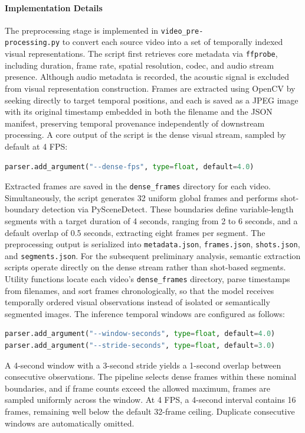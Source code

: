 \paragraph{Implementation Details} The preprocessing stage is implemented in \texttt{video\_pre-\\processing.py} to convert each source video into a set of temporally indexed visual representations. The script first retrieves core metadata via \texttt{ffprobe}, including duration, frame rate, spatial resolution, codec, and audio stream presence. Although audio metadata is recorded, the acoustic signal is excluded from visual representation construction. Frames are extracted using OpenCV by seeking directly to target temporal positions, and each is saved as a JPEG image with its original timestamp embedded in both the filename and the JSON manifest, preserving temporal provenance independently of downstream processing.
A core output of the script is the dense visual stream, sampled by default at 4 FPS:
\begin{lstlisting}[language=Python]
parser.add_argument("--dense-fps", type=float, default=4.0)
\end{lstlisting}
Extracted frames are saved in the \texttt{dense\_frames} directory for each video. Simultaneously, the script generates 32 uniform global frames and performs shot-boundary detection via PySceneDetect. These boundaries define variable-length segments with a target duration of 4 seconds, ranging from 2 to 6 seconds, and a default overlap of 0.5 seconds, extracting eight frames per segment. The preprocessing output is serialized into \texttt{metadata.json}, \texttt{frames.json}, \texttt{shots.json}, and \texttt{segments.json}.
For the subsequent preliminary analysis, semantic extraction scripts operate directly on the dense stream rather than shot-based segments. Utility functions locate each video's \texttt{dense\_frames} directory, parse timestamps from filenames, and sort frames chronologically, so that the model receives temporally ordered visual observations instead of isolated or semantically segmented images.
The inference temporal windows are configured as follows:
\begin{lstlisting}[language=Python]
parser.add_argument("--window-seconds", type=float, default=4.0)
parser.add_argument("--stride-seconds", type=float, default=3.0)
\end{lstlisting}
A 4-second window with a 3-second stride yields a 1-second overlap between consecutive observations. The pipeline selects dense frames within these nominal boundaries, and if frame counts exceed the allowed maximum, frames are sampled uniformly across the window. At 4 FPS, a 4-second interval contains 16 frames, remaining well below the default 32-frame ceiling. Duplicate consecutive windows are automatically omitted.
